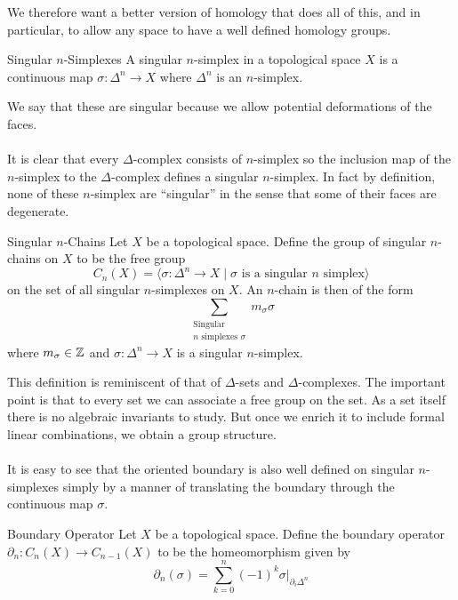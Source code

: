 \documentclass[a4paper]{article}
\begin{document}
We therefore want a better version of homology that does all of this, and in particular, to allow any space to have a well defined homology groups. 

\begin{defn}{Singular $n$-Simplexes}{} A singular $n$-simplex in a topological space $X$ is a continuous map $\sigma:\Delta^n\to X$ where $\Delta^n$ is an $n$-simplex. 
\end{defn}

We say that these are singular because we allow potential deformations of the faces. \\~\\

It is clear that every $\Delta$-complex consists of $n$-simplex so the inclusion map of the $n$-simplex to the $\Delta$-complex defines a singular $n$-simplex. In fact by definition, none of these $n$-simplex are ``singular'' in the sense that some of their faces are degenerate. 

\begin{defn}{Singular $n$-Chains}{} Let $X$ be a topological space. Define the group of singular $n$-chains on $X$ to be the free group $$C_n(X)=\langle\sigma:\Delta^n\to X\;|\;\sigma\text{ is a singular }n\text{ simplex}\rangle $$ on the set of all singular $n$-simplexes on $X$. An $n$-chain is then of the form $$\sum_{\substack{\text{Singular} \\ n \text{ simplexes } \sigma}}m_\sigma\sigma$$ where $m_\sigma\in\mathbb{Z}$ and $\sigma:\Delta^n\to X$ is a singular $n$-simplex. 
\end{defn}

This definition is reminiscent of that of $\Delta$-sets and $\Delta$-complexes. The important point is that to every set we can associate a free group on the set. As a set itself there is no algebraic invariants to study. But once we enrich it to include formal linear combinations, we obtain a group structure. \\~\\

It is easy to see that the oriented boundary is also well defined on singular $n$-simplexes simply by a manner of translating the boundary through the continuous map $\sigma$. 

\begin{defn}{Boundary Operator}{} Let $X$ be a topological space. Define the boundary operator $\partial_n:C_n(X)\to C_{n-1}(X)$ to be the homeomorphism given by $$\partial_n(\sigma)=\sum_{k=0}^n(-1)^k\sigma|_{\partial_i\Delta^n}$$
\end{defn}
\end{document}

